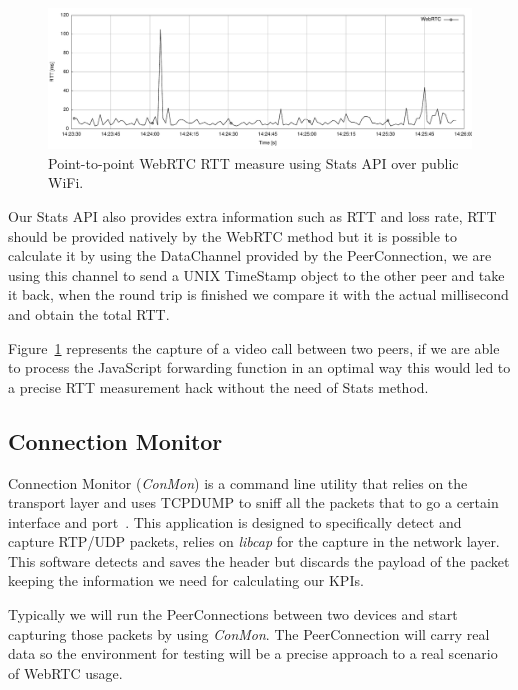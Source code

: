  \begin{figure}[h]
  \centering
    \includegraphics[width=1\textwidth]{./figures/p2prttexample.pdf}
      \caption[Point-to-point WebRTC RTT measure using Stats API over public WiFi]{Point-to-point WebRTC RTT measure using Stats API over public WiFi.}
	\label{fig:p2prttexample}
\end{figure}

Our Stats API also provides extra information such as RTT and loss rate, RTT should be provided natively by the WebRTC method but it is possible to calculate it by using the DataChannel provided by the PeerConnection, we are using this channel to send a UNIX TimeStamp object to the other peer and take it back, when the round trip is finished we compare it with the actual millisecond and obtain the total RTT.

Figure~\ref{fig:p2prttexample} represents the capture of a video call between two peers, if we are able to process the JavaScript forwarding function in an optimal way this would led to a precise RTT measurement hack without the need of Stats method.

\subsection{Connection Monitor}

Connection Monitor ({\it ConMon}) is a command line utility that relies on the transport layer and uses TCPDUMP to sniff all the packets that to go a certain interface and port~\cite{singhConMon}. This application is designed to specifically detect and capture RTP/UDP packets, relies on {\it libcap} for the capture in the network layer. This software detects and saves the header but discards the payload of the packet keeping the information we need for calculating our KPIs.

Typically we will run the PeerConnections between two devices and start capturing those packets by using {\it ConMon}. The PeerConnection will carry real data so the environment for testing will be a precise approach to a real scenario of WebRTC usage.

